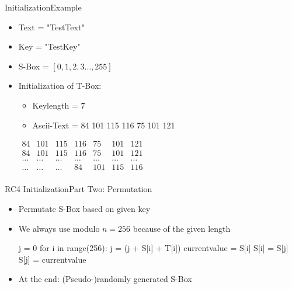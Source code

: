 \documentclass[
	aspectratio=169,	%
	onlytextwidth,		%
	t,					%
	]{beamer}
\begin{document}
\begin{frame}{Initialization}{Example}
	\begin{itemize}
		\item Text = "TestText"
		\item Key = "TestKey"
		\item S-Box = $[0, 1, 2, 3 \dots, 255]$
		\item Initialization of T-Box:
		\begin{itemize}
			\item Keylength = 7
			\item Ascii-Text = 84 101 115 116 75 101 121
		\end{itemize}
		\medskip
		$\begin{array}{|ccccccc|}
		84 & 101 & 115 & 116 & 75 & 101 & 121 \\
		84 & 101 & 115 & 116 & 75 & 101 & 121 \\
		\dots & \dots & \dots & \dots & \dots & \dots & \dots \\
		\dots & \dots & \dots & 84 & 101 & 115 & 116 \\
		\end{array}$
	\end{itemize}
\end{frame}


\begin{frame}[fragile]{RC4 Initialization}{Part Two: Permutation}
	\begin{itemize}
		\item Permutate S-Box based on given key
		\item We always use modulo $n = 256$ because of the given length

		\begin{python}
			j = 0
			for i in range(256):
				j = (j + S[i] + T[i]) %
				currentvalue = S[i]
				S[i] = S[j]
				S[j] = currentvalue
		\end{python}
		\item At the end: (Pseudo-)randomly generated S-Box
		
	\end{itemize}
\end{frame}
\end{document}
